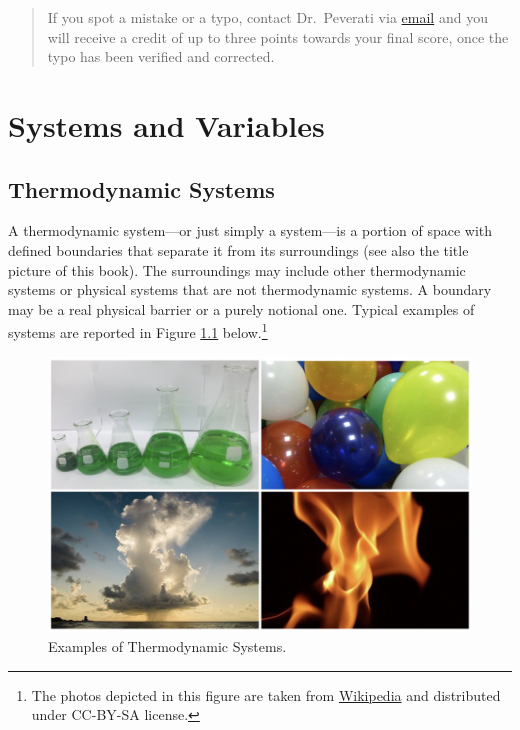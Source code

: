 \documentclass[
]{book}
\theoremstyle{definition}
\theoremstyle{definition}
\theoremstyle{definition}
\theoremstyle{remark}
\begin{document}
\begin{quote}
If you spot a mistake or a typo, contact Dr.~Peverati via \href{mailto:rpeverati@fit.edu}{email} and you will receive a credit of up to three points towards your final score, once the typo has been verified and corrected.
\end{quote}

\renewcommand{\arraystretch}{2}

\hypertarget{SystemVariables}{%
\chapter{Systems and Variables}\label{SystemVariables}}

\hypertarget{thermodynamic-systems}{%
\section{Thermodynamic Systems}\label{thermodynamic-systems}}

A thermodynamic system---or just simply a system---is a portion of space with defined boundaries that separate it from its surroundings (see also the title picture of this book). The surroundings may include other thermodynamic systems or physical systems that are not thermodynamic systems. A boundary may be a real physical barrier or a purely notional one. Typical examples of systems are reported in Figure \ref{fig:Fig1c1} below.\footnote{The photos depicted in this figure are taken from \href{https://en.wikipedia.org}{Wikipedia} and distributed under CC-BY-SA license.}

\begin{figure}

{\centering \includegraphics[width=0.8\linewidth]{./img/OEP_Figures.001} 

}

\caption{Examples of Thermodynamic Systems.}\label{fig:Fig1c1}
\end{figure}
\end{document}
